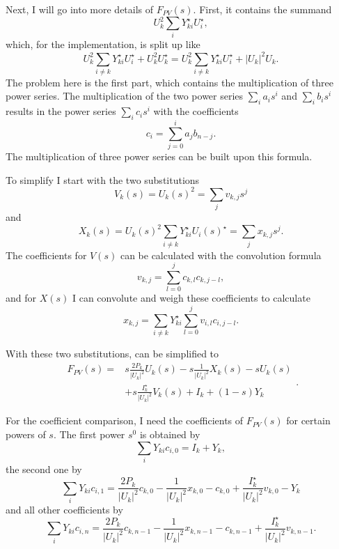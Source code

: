 Next, I will go into more details of $F_{PV}(s)$. First, it contains the summand 
\begin{equation}
	U_k^2 \sum_i Y_{ki}^\star U_i^\star,
\end{equation}
which, for the implementation, is split up like
\begin{equation}
	U_k^2 \sum_{i \ne k} Y_{ki}^\star U_i^\star + U_k^2 U_k^\star = U_k^2 \sum_{i \ne k} Y_{ki}^\star U_i^\star + |U_k|^2 U_k.
\end{equation}
The problem here is the first part, which contains the multiplication of three power series. The multiplication of the two power series $\sum_i a_i s^i$ and $\sum_i b_i s^i$ results in the power series $\sum_i c_i s^i$ with the coefficients
\begin{equation}
	c_i = \sum_{j = 0}^i a_j b_{n - j}.
\end{equation}
The multiplication of three power series can be built upon this formula.

To simplify  I start with the two substitutions
\begin{equation}
	V_k(s) = U_k(s)^2 = \sum_j v_{k,j} s^j
\end{equation}
and
\begin{equation}
	X_k(s) = U_k(s)^2 \sum_{i \ne k} Y_{ki}^\star U_i(s)^\star = \sum_j x_{k,j} s^j.
\end{equation}
The coefficients for $V(s)$ can be calculated with the convolution formula
\begin{equation}
	v_{k,j} = \sum_{l = 0}^j c_{k,l} c_{k,j - l},
\end{equation}
and for $X(s)$ I can convolute and weigh these coefficients to calculate
\begin{equation}
	x_{k,j} = \sum_{i \ne k} Y_{ki}^\star \sum_{l = 0}^j v_{i,l} c_{i,j - l}.
\end{equation}

With these two substitutions,  can be simplified to
\begin{equation}
	\begin{split}
		F_{PV}(s) = 
			& s \frac{2 P_k}{|U_k|^2} U_k(s) - s \frac{1}{|U_k|^2} X_k(s) - s U_k(s) \\
			& + s \frac{I_k^\star}{|U_k|^2} V_k(s) + I_k + (1 - s) Y_k
	\end{split}.
\end{equation}

For the coefficient comparison, I need the coefficients of $F_{PV}(s)$ for certain powers of $s$. The first power $s^0$ is obtained by
\begin{equation}
	\sum_i Y_{ki} c_{i,0} = I_k + Y_k,
\end{equation}
the second one by
\begin{equation}
	\sum_i Y_{ki} c_{i,1} = \frac{2 P_k}{|U_k|^2} c_{k,0} - \frac{1}{|U_k|^2} x_{k,0} - c_{k,0} + \frac{I_k^\star}{|U_k|^2} v_{k,0} - Y_k
\end{equation}
and all other coefficients by
\begin{equation}
	\sum_i Y_{ki} c_{i,n} = \frac{2 P_k}{|U_k|^2} c_{k,n-1} - \frac{1}{|U_k|^2} x_{k,n-1} - c_{k,n-1} + \frac{I_k^\star}{|U_k|^2} v_{k,n-1}.
\end{equation}

